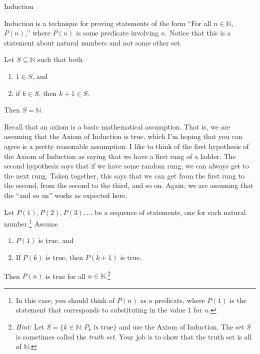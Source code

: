 \begin{section}{Induction}

Induction is a technique for proving statements of the form ``For all \(n\in\mathbb{N}\), \(P(n)\),'' where \(P(n)\) is some predicate involving \(n\).  Notice that this is a statement about natural numbers and not some other set. 

\begin{axiom}
Let \(S\subseteq \mathbb{N}\) such that both
\begin{enumerate}
\item \(1\in S\), and
\item if \(k\in S\), then \(k+1\in S\).
\end{enumerate}
Then \(S=\mathbb{N}\).
\end{axiom}

\begin{remark}
Recall that an axiom is a basic mathematical assumption.  That is, we are assuming that the Axiom of Induction is true, which I'm hoping that you can agree is a pretty reasonable assumption.  I like to think of the first hypothesis of the Axiom of Induction as saying that we have a first rung of a ladder.  The second hypothesis says that if we have some random rung, we can always get to the next rung.  Taken together, this says that we can get from the first rung to the second, from the second to the third, and so on.  Again, we are assuming that the ``and so on'' works as expected here.
\end{remark}

\begin{theorem}
Let \(P(1), P(2), P(3), \ldots\) be a sequence of statements, one for each natural number.\footnote{In this case, you should think of \(P(n)\) as a predicate, where \(P(1)\) is the statement that corresponds to substituting in the value 1 for \(n\).} Assume
\begin{enumerate}
\item \(P(1)\) is true, and
\item If \(P(k)\) is true, then \(P(k+1)\) is true.
\end{enumerate}
Then \(P(n)\) is true for all \(n\in\mathbb{N}\).\footnote{\emph{Hint:} Let \(S=\{k\in \mathbb{N}: P_k \text{ is true}\}\) and use the Axiom of Induction.  The set \(S\) is sometimes called the \emph{truth set}.  Your job is to show that the truth set is all of \(\mathbb{N}\).}
\end{theorem}


\end{section}
